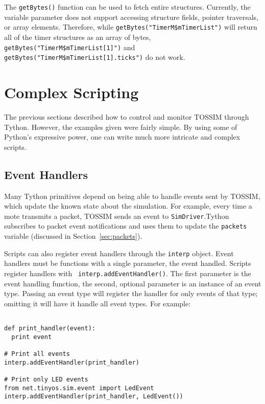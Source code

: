 \documentclass[10pt]{article}
\newcommand{\name}{{Tython}\xspace}
\begin{document}
The {\tt getBytes()} function can be used to fetch entire
structures. Currently, the variable parameter does not support
accessing structure fields, pointer traversals, or array
elements. Therefore, while {\tt getBytes("TimerM\$mTimerList")} will
return all of the timer structures as an array of bytes, \\
{\tt getBytes("TimerM\$mTimerList[1]")} and
{\tt getBytes("TimerM\$mTimerList[1].ticks")} do not work.


\section{Complex Scripting}

The previous sections described how to control and monitor TOSSIM through
\name. However, the examples given were fairly simple. By using some
of Python's expressive power, one can write much more intricate and complex
scripts.

\subsection{Event Handlers}
\label{sec:handlers}

Many \name primitives depend on being able to handle events sent by
TOSSIM, which update the known state about the simulation. For
example, every time a mote transmits a packet, TOSSIM sends an event
to {\tt SimDriver}.\name subscribes to packet event notifications and
uses them to update the {\tt packets} variable (discussed in
Section~\ref{sec:packets}).

Scripts can also register event handlers through the {\tt interp}
object. Event handlers must be functions with a single parameter, the
event handled. Scripts register handlers with {\tt
interp.addEventHandler()}. The first parameter is the event handling
function, the second, optional parameter is an instance of an event
type. Passing an event type will register the handler for only events
of that type; omitting it will have it handle all event types. For example:

\begin{verbatim}

def print_handler(event):
  print event

# Print all events
interp.addEventHandler(print_handler)

# Print only LED events
from net.tinyos.sim.event import LedEvent
interp.addEventHandler(print_handler, LedEvent())

\end{verbatim}
\end{document}
